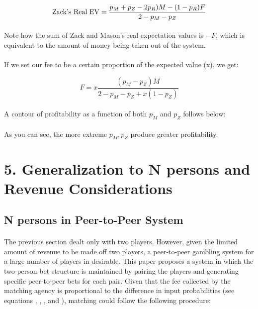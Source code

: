 \documentclass[12pt,letterpaper]{article}
\begin{document}
\begin{equation}
\textnormal{Zack's Real EV} = \frac{p_M + p_Z - 2p_R)M - (1 - p_R)F}{2- p_M - p_Z}
\end{equation}

\paragraph{} Note how the sum of Zack and Mason’s real expectation values is $-F$, which is equivalent to the amount of money being taken out of the system.

\paragraph{} If we set our fee to be a certain proportion of the expected value (x), we get:

\begin{equation}
F = x \frac{(p_M - p_Z)M}{2 - p_M - p_Z + x(1 - p_Z)}
\end{equation}

\paragraph{} A contour of profitability as a function of both $p_M$ and $p_Z$ follows below:

\paragraph{} As you can see, the more extreme $p_M, p_Z$ produce greater profitability.

\section{5.	Generalization to N persons and Revenue Considerations}

\subsection{N persons in Peer-to-Peer System}

\paragraph{} The previous section dealt only with two players. However, given the limited amount of revenue to be made off two players, a peer-to-peer gambling system for a large number of players in desirable. This paper proposes a system in which the two-person bet structure is maintained by pairing the players and generating specific peer-to-peer bets for each pair. Given that the fee collected by the matching agency is proportional to the difference in input probabilities (see equations , , , and ), matching could follow the following procedure:
\end{document}
